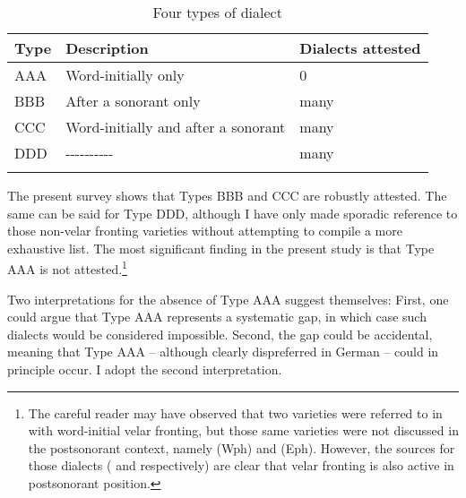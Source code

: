 \begin{table}
\caption{Four types of dialect\label{tab:14:8}}
\begin{tabular}{lll}
\lsptoprule
Type & Description & Dialects attested\\\midrule
AAA & Word-initially only & 0\\
BBB & After a sonorant only & many\\
CCC & Word-initially and after a sonorant & many\\
DDD & {}-{}-{}-{}-{}-{}-{}-{}-{}-{}- & many\\
\lspbottomrule
\end{tabular}
\end{table}

The present survey shows that Types BBB and CCC are robustly attested. The same can be said for Type DDD, although I have only made sporadic reference to those non-velar fronting varieties without attempting to compile a more exhaustive list. The most significant finding in the present study is that Type AAA is not attested.\footnote{{The careful reader may have observed that two varieties were referred to in  with word-initial velar fronting, but those same varieties were not discussed in the postsonorant context, namely  (Wph) and  (Eph). However, the sources for those dialects (\citealt{Beisenherz1907} and \citealt{Jungandreas1926,Jungandreas1927} respectively) are clear that velar fronting is also active in postsonorant position.}}

Two interpretations for the absence of Type AAA suggest themselves: First, one could argue that Type AAA represents a systematic gap, in which case such dialects would be considered impossible. Second, the gap could be accidental, meaning that Type AAA -- although clearly dispreferred in German -- could in principle occur. I adopt the second interpretation.

